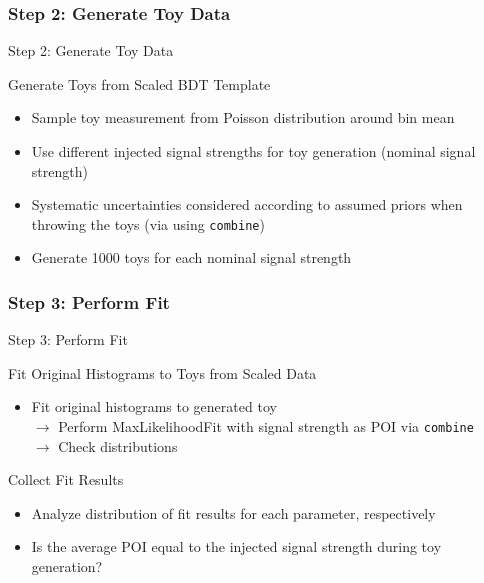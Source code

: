 \subsubsection{Step 2: Generate Toy Data}
\begin{frame}{Step 2: Generate Toy Data}
\begin{block}{Generate Toys from Scaled BDT Template}
\begin{itemize}
\item Sample toy measurement from Poisson distribution around bin mean
\item Use different injected signal strengths for toy generation (nominal signal strength)
\item Systematic uncertainties considered according to assumed priors when throwing the toys (via using \texttt{combine})
\item Generate \num{1000} toys for each nominal signal strength
\end{itemize}
\end{block}
\end{frame}

\subsubsection{Step 3: Perform Fit}

\begin{frame}{Step 3: Perform Fit}
\begin{block}{Fit Original Histograms to Toys from Scaled Data}
\begin{itemize}
\item Fit original histograms to generated toy\\
$\rightarrow$ Perform MaxLikelihoodFit with signal strength as POI via \texttt{combine}\\
$\rightarrow$ Check distributions
\end{itemize}
\end{block}

\begin{block}{Collect Fit Results}
\begin{itemize}
\item Analyze distribution of fit results for each parameter, respectively
\item Is the average POI equal to the injected signal strength during toy generation? 
\end{itemize}
\end{block}

\end{frame}

